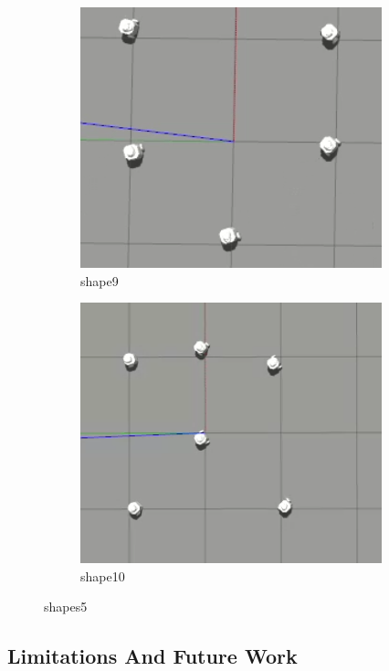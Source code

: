 \documentclass[12pt]{extarticle}
\begin{document}
\begin{figure}[H]
\centering
\begin{subfigure}{.5\textwidth}
  \centering
  \includegraphics[width=.7\linewidth]{shape9}
  \caption{shape9}
  \label{fig:sub1}
\end{subfigure}%
\begin{subfigure}{.5\textwidth}
  \centering
  \includegraphics[width=.7\linewidth]{shape10}
  \caption{shape10}
  \label{fig:sub2}
\end{subfigure}
\caption{shapes5}
\label{fig:test}



\end{figure}

\subsection{Limitations And Future Work}
\end{document}
